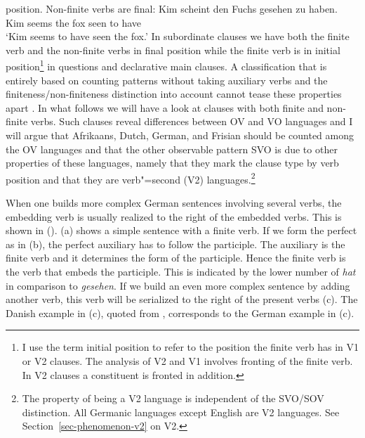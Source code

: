 position. Non-finite verbs are final: 
\ea
\gll Kim scheint den Fuchs gesehen zu haben.\\
     Kim seems   the fox  seen to have\\
\glt `Kim seems to have seen the fox.'
\z
In subordinate clauses we have both the finite verb and the non-finite verbs in final position while
the finite verb is in initial position\footnote{%
  I use the term initial position to refer to the position the finite verb has in V1 or V2 clauses. The
  analysis of V2 and V1 involves fronting of the finite verb. In V2 clauses a constituent is fronted
  in addition.
} in questions and declarative main clauses.
A classification that is entirely based on counting patterns without taking auxiliary verbs and the
finiteness/non-finiteness distinction into account cannot tease these properties apart \citep[Section~3]{Hoehle83a}. In what follows we will have a look at clauses with
both finite and non-finite verbs. Such clauses reveal differences between OV and VO languages and I will argue that Afrikaans, Dutch,
German, and Frisian should be counted among the OV languages and that the other observable pattern
SVO is due to other properties of these languages, namely that they mark the clause type by verb
position and that they are verb"=second (V2) languages.\footnote{%
  The property of being a V2 language is independent of the SVO/SOV distinction. All Germanic
  languages except English are V2 languages. See Section~\ref{sec-phenomenon-v2} on V2.
}

When one builds more complex German sentences involving several verbs, the embedding verb is usually
realized to the right of the embedded verbs. 
This is shown in (). (a) shows a simple
sentence with a finite verb. If we form the perfect as in (b), the perfect auxiliary has to
follow the participle. The auxiliary is the finite verb and it determines the form of the
participle. Hence the finite verb is the verb that embeds the participle. This is indicated by the
lower number of \emph{hat} in comparison to \emph{gesehen}. If we build an even more complex
sentence by adding another verb, this verb will be serialized to the right of the present verbs
(c).  The Danish example in (c), quoted from \citet[]{Oersnes2009b}, corresponds to the
German example in (c).

